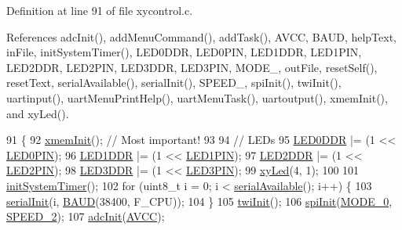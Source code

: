 Definition at line 91 of file xycontrol.\-c.



References adc\-Init(), add\-Menu\-Command(), add\-Task(), A\-V\-C\-C, B\-A\-U\-D, help\-Text, in\-File, init\-System\-Timer(), L\-E\-D0\-D\-D\-R, L\-E\-D0\-P\-I\-N, L\-E\-D1\-D\-D\-R, L\-E\-D1\-P\-I\-N, L\-E\-D2\-D\-D\-R, L\-E\-D2\-P\-I\-N, L\-E\-D3\-D\-D\-R, L\-E\-D3\-P\-I\-N, M\-O\-D\-E\-\_, out\-File, reset\-Self(), reset\-Text, serial\-Available(), serial\-Init(), S\-P\-E\-E\-D\-\_, spi\-Init(), twi\-Init(), uartinput(), uart\-Menu\-Print\-Help(), uart\-Menu\-Task(), uartoutput(), xmem\-Init(), and xy\-Led().


\begin{DoxyCode}
91                   \{
92     \hyperlink{group__xmem_ga9744de3b2aca21a564b151e770ed7384}{xmemInit}(); \textcolor{comment}{// Most important!}
93 
94     \textcolor{comment}{// LEDs}
95     \hyperlink{group__config_ga86208659221ec2a932cd722dfc18101f}{LED0DDR} |= (1 << \hyperlink{group__config_gab0e1f692e2b1fa1cdbb24a9926b3489d}{LED0PIN});
96     \hyperlink{group__config_gab0f33b52cdb68e643eba6cf583fb625f}{LED1DDR} |= (1 << \hyperlink{group__config_ga04d7aaffbb7b5afaf49acf8a3a39e33a}{LED1PIN});
97     \hyperlink{group__config_ga7e635626ee31b094da0a668476132577}{LED2DDR} |= (1 << \hyperlink{group__config_ga50070e632cb68d11f627c5ab60f88683}{LED2PIN});
98     \hyperlink{group__config_ga09535652dd0ca340b20840c848cb6093}{LED3DDR} |= (1 << \hyperlink{group__config_ga2663b8fc01c4753562adc572cf12a5ed}{LED3PIN});
99     \hyperlink{group__xycontrol_ga783aead7f97dd462a9af56b7fc3b228f}{xyLed}(4, 1);
100 
101     \hyperlink{group__time_ga66bac2517b216a802f8fb2233eccfa66}{initSystemTimer}();
102     \textcolor{keywordflow}{for} (uint8\_t i = 0; i < \hyperlink{group__uart_ga1ea963b291215ad9c5e8a0610f116b90}{serialAvailable}(); i++) \{
103         \hyperlink{group__uart_ga73d4335cb201753c580c87954f493886}{serialInit}(i, \hyperlink{group__uart_gafccfd7d1315f0763ac404c6104883341}{BAUD}(38400, F\_CPU));
104     \}
105     \hyperlink{group__twi_ga1a9c88673ee82a5a84274814f168ea78}{twiInit}();
106     \hyperlink{group__spi_gab16bbe73b15109ae6ca700391711d036}{spiInit}(\hyperlink{group__spi_ggae506139af46f1328f631ddacd54af96da68ae6cc4ed3f27fe8040eb93d9c4efa3}{MODE\_0}, \hyperlink{group__spi_gga92b13fd51af2a9a09b1854520a5a427fa3e1a04cc2aad70558b57122e6b70f8b6}{SPEED\_2});
107     \hyperlink{group__adc_ga658c8b976878603187b79166345319e0}{adcInit}(\hyperlink{group__adc_gga7fc3dc0de11790b4393b4be70d79a02faead1f65bef727ff7542b8139baceae9c}{AVCC});

\end{DoxyCode}
